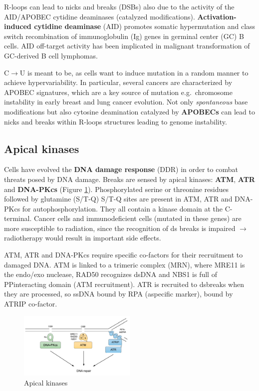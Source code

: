 R-loops can lead to nicks and breaks (DSBs) also due to the activity of the AID/APOBEC cytidine deaminases (catalyzed modifications). \textbf{Activation-induced cytidine deaminase} (AID) promotes somatic hypermutation and class switch recombination of immunoglobulin (Ig) genes in germinal center (GC) B cells. AID off-target activity has been implicated in malignant transformation of GC-derived B cell lymphomas.

C$\rightarrow$U is meant to be, as cells want to induce mutation in a random manner to achieve hypervariability. In particular, several cancers are characterized by APOBEC signatures, which are a key source of mutation e.g.~chromosome instability in early breast and lung cancer evolution. Not only \emph{spontaneous} base modifications but also cytosine deamination catalyzed by \textbf{APOBECs} can lead to nicks and breaks within R-loops structures leading to genome instability.

\hypertarget{apical-kinases}{%
\subsection{Apical kinases}\label{apical-kinases}}

Cells have evolved the \textbf{DNA damage response} (DDR) in order to combat threats
posed by DNA damage. Breaks are sensed by apical kinases: \textbf{ATM}, \textbf{ATR} and \textbf{DNA-PKcs} (Figure \ref{fig:apical}). Phosphorylated serine or threonine residues followed by glutamine (S/T-Q) S/T-Q sites are present in ATM, ATR and DNA-PKcs for autophosphorylation. They all contain a kinase domain at the C-terminal. Cancer cells and immunodeficient cells (mutated in these genes) are more susceptible to radiation, since the recognition of ds breaks is impaired $\rightarrow$ radiotherapy would result in important side effects.

ATM, ATR and DNA-PKcs require specific co-factors for their recruitment to
damaged DNA. ATM is linked to a trimeric complex (MRN), where MRE11 is the endo/exo nuclease, RAD50 recognizes dsDNA and NBS1 is full of PPinteracting domain (ATM recruitment). ATR is recruited to dsbreaks when they are processed, so ssDNA bound by RPA (aspecific marker), bound by ATRIP co-factor.

\begin{figure}
\centering
\includegraphics[width=0.5\textwidth]{../_resources/Screen_Shot_2022-11-30_at_09-11-05.png}
\caption{Apical kinases}
\label{fig:apical}
\end{figure}

